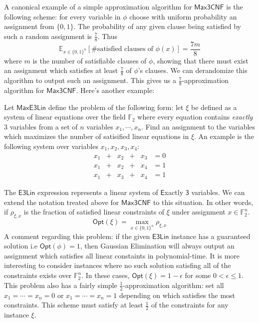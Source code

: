 A canonical example of a simple approximation algorithm for $\mathsf{Max3CNF}$ is the following scheme: for every variable in $\phi$ choose with uniform probability an assignment from $\{0,1\}$. The probability of any given clause being satisfied by such a random assignment is $\frac{7}{8}$. Thus
%
\[ \mathbb{E}_{x \in \{0,1\}^n}[\text{\# satisfied clauses of $\phi(x)$}] = \frac{7m}{8} \]
%
where $m$ is the number of satisfiable clauses of $\phi$, showing that there must exist an assignment which satisfies at least $\frac{7}{8}$ of $\phi$'s clauses. We can derandomize this algorithm to output such an assignment. This gives us a $\frac{7}{8}$-approximation algorithm for $\mathsf{Max3CNF}$. Here's another example:
%
\begin{example} \label{e3linexample}
  Let $\mathsf{MaxE3Lin}$ define the problem of the following form: let $\xi$ be defined as a system of linear equations over the field $\mathbb{F}_2$ where every equation contains \emph{exactly} $3$ variables from a set of $n$ variables $x_1,\cdots,x_n$. Find an assignment to the variables which maximizes the number of satisified linear equations in $\xi$. An example is the following system over variables $x_1,x_2,x_3,x_4$:
  \begin{equation*}
    \begin{alignedat}{3}
      x_1 & +{} &  x_2 & +{} & x_3 & = 0 \\
      x_1 & +{} &  x_2 & +{} &  x_4 & = 1 \\
      x_1 & +{} & x_3 & +{} & x_4 & = 1
\end{alignedat}
\end{equation*}
\end{example}
%
The $\mathsf{E3Lin}$ expression represents a linear system of $\mathsf{E}$xactly $\mathsf{3}$ variables. We can extend the notation treated above for $\mathsf{Max3CNF}$ to this situation. In other words, if $\rho_{\xi,x}$ is the fraction of satisfied linear constraints of $\xi$ under assignment $x \in \mathbb{F}_2^n$.
%
\[\mathsf{Opt}(\xi) =\max_{x \in \{0,1\}^n}\rho_{\xi,x}\]
%
A comment regarding this problem: if the given $\mathsf{E3Lin}$ instance has a guaranteed solution i.e $\mathsf{Opt}(\phi) = 1$, then Gaussian Elimination will always output an assignment which satisfies all linear constaints in polynomial-time. It is more interesting to consider instances where no such solution satisfing all of the constraints exists over $\mathbb{F}_2^n$. In these cases, $\mathsf{Opt}(\xi) = 1 - \epsilon$ for some $0 < \epsilon \leq 1$. This problem also has a fairly simple $\frac{1}{2}$-approximation algorithm: set all $x_1 = \cdots = x_n  = 0$ or $x_1 = \cdots = x_n  = 1$ depending on which satisfies the most constraints. This scheme must satisfy at least $\frac{1}{2}$ of the constraints for any instance $\xi$. \newline

